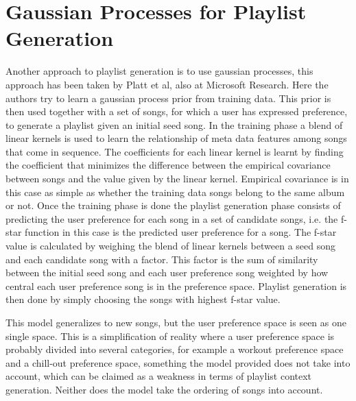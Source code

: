 \section{Gaussian Processes for Playlist Generation}
Another approach to playlist generation is to use gaussian processes, this approach has been taken by Platt et al, also at Microsoft Research. Here the authors try to learn a gaussian process prior from training data. This prior is then used together with a set of songs, for which a user has expressed preference, to generate a playlist given an initial seed song. In the training phase a blend of linear kernels is used to learn the relationship of meta data features among songs that come in sequence. The coefficients for each linear kernel is learnt by finding the coefficient that minimizes the difference between the empirical covariance between songs and the value given by the linear kernel. Empirical covariance is in this case as simple as whether the training data songs belong to the same album or not. Once the training phase is done the playlist generation phase consists of predicting the user preference for each song in a set of candidate songs, i.e. the f-star function in this case is the predicted user preference for a song. The f-star value is calculated by weighing the blend of linear kernels between a seed song and each candidate song with a factor. This factor is the sum of similarity between the initial seed song and each user preference song weighted by how central each user preference song is in the preference space. Playlist generation is then done by simply choosing the songs with highest f-star value\cite{platt2001learning}.

This model generalizes to new songs, but the user preference space is seen as one single space. This is a simplification of reality where a user preference space is probably divided into several categories, for example a workout preference space and a chill-out preference space, something the model provided does not take into account, which can be claimed as a weakness in terms of playlist context generation. Neither does the model take the ordering of songs into account.